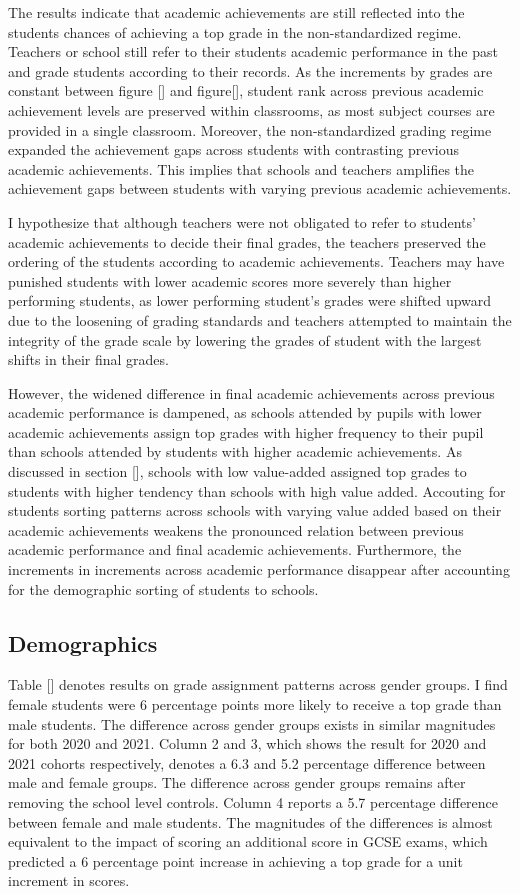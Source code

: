 The results indicate that academic achievements are still reflected into the students chances of achieving a top grade in the non-standardized regime. Teachers or school still refer to their students academic performance in the past and grade students according to their records. As the increments by grades are constant between figure [] and figure[], student rank across previous academic achievement levels are preserved within classrooms, as most subject courses are provided in a single classroom. Moreover, the non-standardized grading regime expanded the achievement gaps across students with contrasting previous academic achievements. This implies that schools and teachers amplifies the achievement gaps between students with varying previous academic achievements.

I hypothesize that although teachers were not obligated to refer to students' academic achievements to decide their final grades, the teachers preserved the ordering of the students according to academic achievements. Teachers may have punished students with lower academic scores more severely than higher performing students, as lower performing student's grades were shifted upward due to the loosening of grading standards and teachers attempted to maintain the integrity of the grade scale by lowering the grades of student with the largest shifts in their final grades. 

However, the widened difference in final academic achievements across previous academic performance is dampened, as schools attended by pupils with lower academic achievements assign top grades with higher frequency to their pupil than schools attended by students with higher academic achievements.  As discussed in section [], schools with low value-added assigned top grades to students with higher tendency than schools with high value added. Accouting for students sorting patterns across schools with varying value added based on their academic achievements weakens the pronounced relation between previous academic performance and final academic achievements. Furthermore, the increments in increments across academic performance disappear after accounting for the demographic sorting of students to schools.  

\subsection{Demographics}
Table [] denotes results on grade assignment patterns across gender groups. I find female students were 6 percentage points more likely to receive a top grade than male students. The difference across gender groups exists in similar magnitudes for both 2020 and 2021. Column 2 and 3, which shows the result for 2020 and 2021 cohorts respectively, denotes a 6.3 and 5.2 percentage difference between male and female groups. The difference across gender groups remains after removing the school level controls. Column 4 reports a 5.7 percentage difference between female and male students. The magnitudes of the differences is almost equivalent to the impact of scoring an additional score in GCSE exams, which predicted a 6 percentage point increase in achieving a top grade for a unit increment in scores. 

